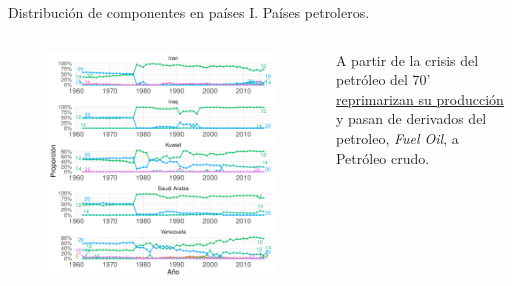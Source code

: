 \documentclass[compress]{beamer}
\begin{document}


\begin{frame}

\small

Distribución de componentes en países I. Países petroleros.

\begin{columns}[c] 

\begin{figure}
\includegraphics[width=\linewidth]{graficoLDA_k30_IRN_IRQ_KWT_SAU_VEN}
\end{figure}


A partir de la crisis del petróleo del 70' \underline{reprimarizan su producción} y pasan de derivados del petroleo, \textit{Fuel Oil}, a Petróleo crudo.

\end{columns} 

\end{frame}
\end{document}
